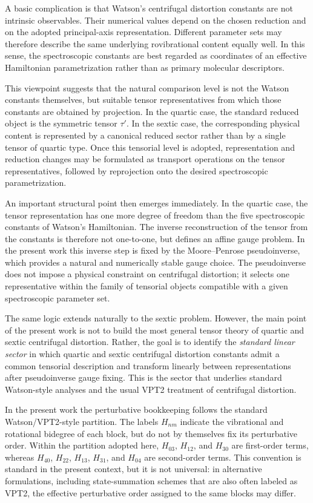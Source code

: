 \documentclass[journal=jacsat,manuscript=article]{achemso}
\begin{document}
A basic complication is that Watson's centrifugal distortion constants
are not intrinsic observables. Their numerical values depend on the
chosen reduction and on the adopted principal-axis representation.
Different parameter sets may therefore describe the same underlying
rovibrational content equally well. In this sense, the spectroscopic
constants are best regarded as coordinates of an effective Hamiltonian
parametrization rather than as primary molecular descriptors.

This viewpoint suggests that the natural comparison level is not the
Watson constants themselves, but suitable tensor representatives from
which those constants are obtained by projection. In the quartic case,
the standard reduced object is the symmetric tensor $\tau'$. In the
sextic case, the corresponding physical content is represented by a
canonical reduced sector rather than by a single tensor of quartic
type. Once this tensorial level is adopted, representation and
reduction changes may be formulated as transport operations on the
tensor representatives, followed by reprojection onto the desired
spectroscopic parametrization.

An important structural point then emerges immediately. In the quartic
case, the tensor representation has one more degree of freedom than
the five spectroscopic constants of Watson's Hamiltonian. The inverse
reconstruction of the tensor from the constants is therefore not
one-to-one, but defines an affine gauge problem. In the present work
this inverse step is fixed by the Moore--Penrose pseudoinverse, which
provides a natural and numerically stable gauge choice. The
pseudoinverse does not impose a physical constraint on centrifugal
distortion; it selects one representative within the family of
tensorial objects compatible with a given spectroscopic parameter set.

The same logic extends naturally to the sextic problem. However, the
main point of the present work is not to build the most general tensor
theory of quartic and sextic centrifugal distortion. Rather, the goal
is to identify the \emph{standard linear sector} in which quartic and
sextic centrifugal distortion constants admit a common tensorial
description and transform linearly between representations after
pseudoinverse gauge fixing. This is the sector that underlies standard
Watson-style analyses and the usual VPT2 treatment of centrifugal
distortion.

In the present work the perturbative bookkeeping follows the standard
Watson/VPT2-style partition. The labels $H_{nm}$ indicate the
vibrational and rotational bidegree of each block, but do not by
themselves fix its perturbative order. Within the partition adopted
here, $H_{03}$, $H_{12}$, and $H_{30}$ are first-order terms, whereas
$H_{40}$, $H_{22}$, $H_{13}$, $H_{31}$, and $H_{04}$ are second-order
terms. This convention is standard in the present context, but it is
not universal: in alternative formulations, including state-summation
schemes that are also often labeled as VPT2, the effective
perturbative order assigned to the same blocks may differ.
\end{document}

